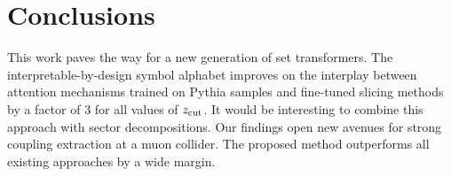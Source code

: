 \section{Conclusions}\label{sec:conclusions}

This work paves the way for a new generation of set transformers. The
interpretable-by-design symbol alphabet improves on the interplay
between attention mechanisms trained on Pythia samples and fine-tuned
slicing methods by a factor of 3 for all values of $z_{\rm cut}$. It
would be interesting to combine this approach with sector
decompositions. Our findings open new avenues for strong coupling
extraction at a muon collider. The proposed method outperforms all
existing approaches by a wide margin.

